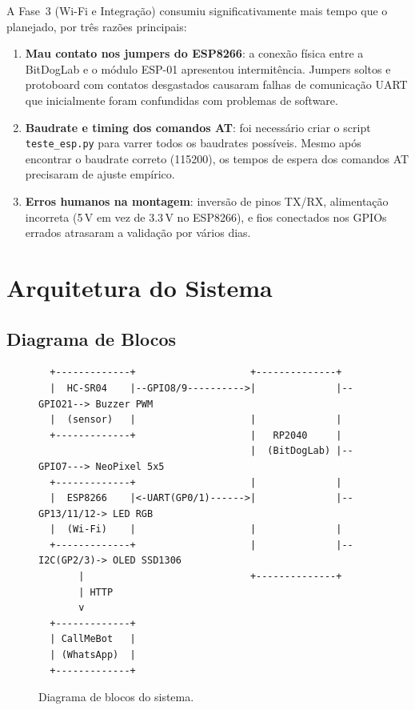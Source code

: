\documentclass[12pt, a4paper]{article}
\begin{document}
A Fase~3 (Wi-Fi e Integração) consumiu significativamente mais tempo que o planejado, por três razões principais:

\begin{enumerate}
  \item \textbf{Mau contato nos jumpers do ESP8266}: a conexão física entre a BitDogLab e o módulo ESP-01 apresentou intermitência. Jumpers soltos e protoboard com contatos desgastados causaram falhas de comunicação UART que inicialmente foram confundidas com problemas de software.
  \item \textbf{Baudrate e timing dos comandos AT}: foi necessário criar o script \texttt{teste\_esp.py} para varrer todos os baudrates possíveis. Mesmo após encontrar o baudrate correto (115200), os tempos de espera dos comandos AT precisaram de ajuste empírico.
  \item \textbf{Erros humanos na montagem}: inversão de pinos TX/RX, alimentação incorreta (5\,V em vez de 3.3\,V no ESP8266), e fios conectados nos GPIOs errados atrasaram a validação por vários dias.
\end{enumerate}


\section{Arquitetura do Sistema}
\label{sec:arquitetura}

\subsection{Diagrama de Blocos}

\begin{figure}[H]
\centering
\begin{verbatim}
  +-------------+                    +--------------+
  |  HC-SR04    |--GPIO8/9---------->|              |--GPIO21--> Buzzer PWM
  |  (sensor)   |                    |              |
  +-------------+                    |   RP2040     |
                                     |  (BitDogLab) |--GPIO7---> NeoPixel 5x5
  +-------------+                    |              |
  |  ESP8266    |<-UART(GP0/1)------>|              |--GP13/11/12-> LED RGB
  |  (Wi-Fi)    |                    |              |
  +-------------+                    |              |--I2C(GP2/3)-> OLED SSD1306
       |                             +--------------+
       | HTTP
       v
  +-------------+
  | CallMeBot   |
  | (WhatsApp)  |
  +-------------+
\end{verbatim}
\caption{Diagrama de blocos do sistema.}
\label{fig:diagrama-texto}
\end{figure}
\end{document}
